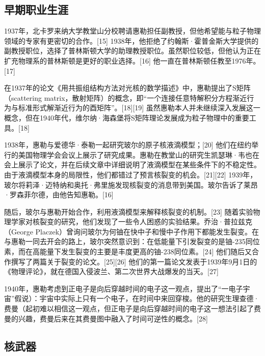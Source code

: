 \subsection{早期职业生涯}
1937年，北卡罗来纳大学教堂山分校聘请惠勒担任副教授，但他希望能与粒子物理领域的专家有更密切的合作。[15] 1938年，他拒绝了约翰斯·霍普金斯大学提供的副教授职位，选择了普林斯顿大学的助理教授职位。虽然职位较低，但他认为正在扩充物理系的普林斯顿是更好的职业选择。[16] 他一直在普林斯顿任教至1976年。[17]

在1937年的论文《用共振组结构方法对光核的数学描述》中，惠勒提出了S矩阵（scattering matrix，散射矩阵）的概念，即“一个连接任意特解积分方程渐近行为与标准形式解渐近行为的酉矩阵”。[18][19] 虽然惠勒本人并未继续深入发展这一概念，但在1940年代，维尔纳·海森堡将S矩阵理论发展成为粒子物理中的重要工具。[18]

1938年，惠勒与爱德华·泰勒一起研究玻尔的原子核液滴模型；[20] 他们在纽约举行的美国物理学会会议上展示了研究成果。惠勒在教堂山的研究生凯瑟琳·韦也在会上展示了论文，并在后续文章中详细说明了液滴模型在某些条件下的不稳定性。由于液滴模型本身的局限性，他们都错过了预言核裂变的机会。[21][22] 1939年，玻尔将莉泽·迈特纳和奥托·弗里施发现核裂变的消息带到美国。玻尔告诉了莱昂·罗森菲尔德，由他告知惠勒。[16]

随后，玻尔与惠勒开始合作，利用液滴模型来解释核裂变的机制。[23] 随着实验物理学家对核裂变的研究，他们发现了一些令人困惑的实验结果。乔治·普拉兹克（George Placzek）曾询问玻尔为何铀在快中子和慢中子作用下都能发生裂变。在与惠勒一同去开会的路上，玻尔突然意识到：在低能量下引发裂变的是铀-235同位素，而在高能量下发生裂变的主要是丰度更高的铀-238同位素。[24] 他们随后又合作撰写了两篇关于裂变的论文。[25][26] 他们的第一篇论文发表于1939年9月1日的《物理评论》，就在德国入侵波兰、第二次世界大战爆发的当天。[27]

1940年，惠勒考虑到正电子是向后穿越时间的电子这一观点，提出了“一电子宇宙”假说）：宇宙中实际上只有一个电子，在时间中来回穿梭。他的研究生理查德·费曼（起初难以相信这一观点，但正电子是向后穿越时间的电子这一想法引起了费曼的兴趣，费曼后来在其费曼图中融入了时间可逆性的概念。[28]
\subsection{核武器}
